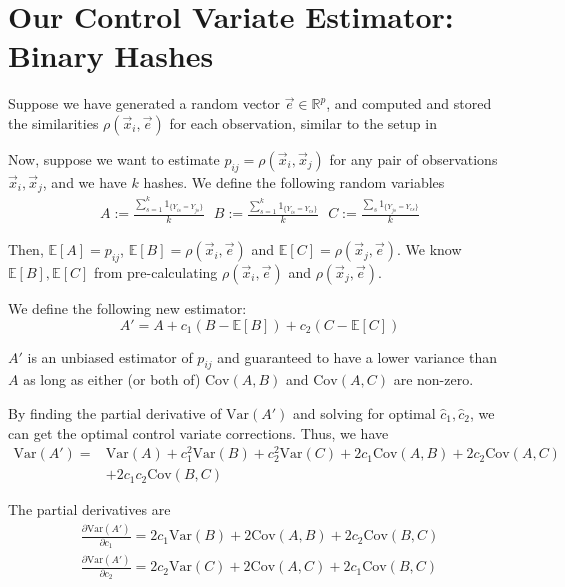 \documentclass[runningheads]{llncs}
\newcommand{\var}{\text{Var}}
\newcommand{\cov}{\text{Cov}}
\newcommand{\e}{\mathbb{E}}
\begin{document}
\section{Our Control Variate Estimator: Binary Hashes}

Suppose we have generated a random vector $\vec{e} \in \mathbb{R}^p$, and computed and stored the similarities $\rho(\vec{x}_i, \vec{e})$ for each observation, similar to the setup in \cite{kang2018improving,Kang2021-correlations}
        
        Now, suppose we want to estimate $p_{ij} = \rho(\vec{x}_i, \vec{x}_j)$ for any pair of observations $\vec{x}_i, \vec{x}_j$, and we have $k$ hashes. We define the following random variables
\begin{align}
A := \frac{\sum_{s=1}^k 1_{\{Y_{is} = Y_{js}\}}}{k} ~~~ B := \frac{\sum_{s=1}^k 1_{\{Y_{is} = Y_{es}\}}}{k} ~~~ C := \frac{\sum_s 1_{\{Y_{js} = Y_{es}\}}}{k}
\end{align}
        
        Then, $\mathbb{E}[A] = p_{ij}$, $\mathbb{E}[B] = \rho(\vec{x}_i, \vec{e})$ and $\mathbb{E}[C] = \rho(\vec{x}_j, \vec{e})$. We know $\mathbb{E}[B], \mathbb{E}[C]$ from pre-calculating $\rho(\vec{x}_i, \vec{e})$ and $\rho(\vec{x}_j, \vec{e})$.
        
We define the following new estimator:
        \begin{equation}\label{cv_est}
            A' = A + c_1(B - \e[B]) + c_2(C - \e[C])
        \end{equation}

$A'$ is an unbiased estimator of $p_{ij}$ and guaranteed to have a lower variance than $A$ as long as either (or both of) $\text{Cov}(A, B)$ and $\text{Cov}(A, C)$ are non-zero.
        
        By finding the partial derivative of $\text{Var}(A')$ and solving for optimal $\hat{c}_1, \hat{c}_2$, we can get the optimal control variate corrections. Thus, we have
        \begin{equation}
        \begin{split}
            \var(A') = &\var(A) + c_1^2\var(B) + c_2^2\var(C) + 2c_1 \cov(A, B) + 2c_2 \cov(A, C) \\
            &+ 2c_1 c_2 \cov(B, C)
        \end{split}
        \end{equation}

The partial derivatives are
        \begin{align}
            \frac{\partial\var(A')}{\partial c_1} = 2c_1\var(B) + 2\cov(A, B) + 2c_2\cov(B,C)\\
            \frac{\partial\var(A')}{\partial c_2} = 2c_2\var(C) + 2\cov(A, C) + 2c_1\cov(B,C)
        \end{align}
        
\end{document}
